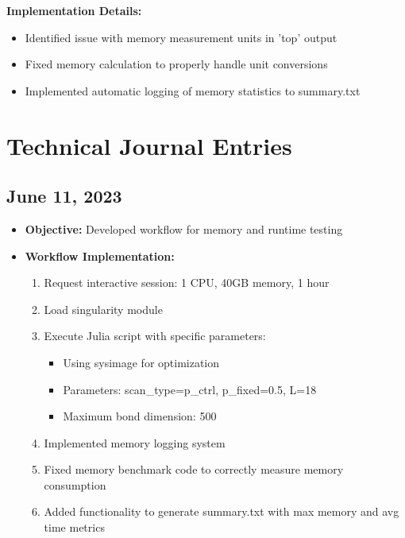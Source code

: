 \documentclass[11pt,a4paper]{article}
\begin{document}
\textbf{Implementation Details:}
\begin{itemize}
    \item Identified issue with memory measurement units in 'top' output
    \item Fixed memory calculation to properly handle unit conversions
    \item Implemented automatic logging of memory statistics to summary.txt
\end{itemize}

\section{Technical Journal Entries}

\subsection{June 11, 2023}
\begin{itemize}
    \item \textbf{Objective:} Developed workflow for memory and runtime testing
    \item \textbf{Workflow Implementation:}
    \begin{enumerate}
        \item Request interactive session: 1 CPU, 40GB memory, 1 hour
        \item Load singularity module
        \item Execute Julia script with specific parameters:
            \begin{itemize}
                \item Using sysimage for optimization
                \item Parameters: scan\_type=p\_ctrl, p\_fixed=0.5, L=18
                \item Maximum bond dimension: 500
            \end{itemize}
        \item Implemented memory logging system
        \item Fixed memory benchmark code to correctly measure memory consumption
        \item Added functionality to generate summary.txt with max memory and avg time metrics
    \end{enumerate}
\end{itemize}
\end{document}
